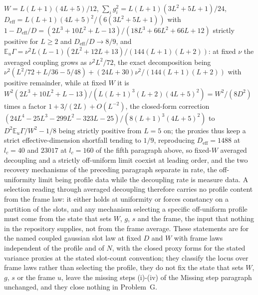 \(W=L(L+1)(4L+5)/12\), \(\sum_{i}g_{i}^{2}=L(L+1)(3L^{2}+5L+1)/24\), \(D_{\mathrm{eff}}=L(L+1)(4L+5)^{2}/(6(3L^{2}+5L+1))\) with \(1-D_{\mathrm{eff}}/D=(2L^{3}+10L^{2}+L-13)/(18L^{3}+66L^{2}+66L+12)\) strictly positive for \(L\ge2\) and \(D_{\mathrm{eff}}/D\to 8/9\), and \(\mathbb{E}_{u}\Gamma=\nu^{2}L(L-1)(2L^{2}+12L+13)/(144(L+1)(L+2))\): at fixed \(\nu\) the averaged coupling grows as \(\nu^{2}L^{2}/72\), the exact decomposition being \(\nu^{2}(L^{2}/72+L/36-5/48)+(24L+30)\nu^{2}/(144(L+1)(L+2))\) with positive remainder, while at fixed \(W\) it is \(W^{2}(2L^{3}+10L^{2}+L-13)/(L(L+1)^{3}(L+2)(4L+5)^{2})=W^{2}/(8D^{2})\) times a factor \(1+3/(2L)+O(L^{-2})\), the closed-form correction \((24L^{4}-25L^{3}-299L^{2}-323L-25)/(8(L+1)^{3}(4L+5)^{2})\) to \(D^{2}\mathbb{E}_{u}\Gamma/W^{2}-1/8\) being strictly positive from \(L=5\) on; the proxies thus keep a strict effective-dimension shortfall tending to \(1/9\), reproducing \(D_{\mathrm{eff}}=1488\) at \(l_c=40\) and \(23017\) at \(l_c=160\) of the fifth paragraph above, so fixed-\(W\) averaged decoupling and a strictly off-uniform limit coexist at leading order, and the two recovery mechanisms of the preceding paragraph separate in rate, the off-uniformity limit being profile data while the decoupling rate is measure data. A selection reading through averaged decoupling therefore carries no profile content from the frame law: it either holds at uniformity or forces constancy on a partition of the slots, and any mechanism selecting a specific off-uniform profile must come from the state that sets \(W\), \(g\), \(s\) and the frame, the input that nothing in the repository supplies, not from the frame average. These statements are for the named coupled gaussian slot law at fixed \(D\) and \(W\) with frame laws independent of the profile and of \(N\), with the closed proxy forms for the stated variance proxies at the stated slot-count convention; they classify the locus over frame laws rather than selecting the profile, they do not fix the state that sets \(W\), \(g\), \(s\) or the frame \(u\), leave the missing steps (i)-(iv) of the Missing step paragraph unchanged, and they close nothing in Problem~G.

